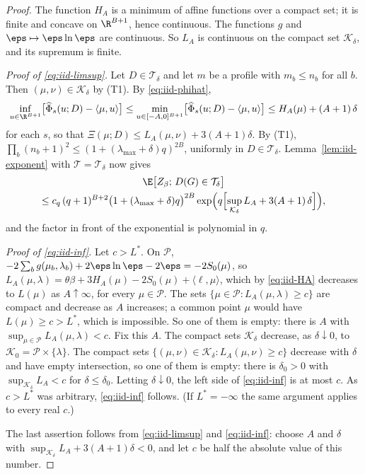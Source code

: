 \begin{proof}
The function $H_A$ is a minimum of affine functions over a compact set; it is finite and
concave on $\R^{B+1}$, hence continuous. The functions $g$ and $\eps\mapsto\eps\ln\eps$ are
continuous. So $L_A$ is continuous on the compact set $\mathcal{K}_\delta$, and its
supremum is finite.

\emph{Proof of \eqref{eq:iid-limsup}.} Let $D\in\mathcal{T}_\delta$ and let $m$ be a
profile with $m_b\le n_b$ for all $b$. Then $(\mu,\nu)\in\mathcal{K}_\delta$ by (T1). By
\eqref{eq:iid-phihat},
\[
\inf_{u\in\R^{B+1}}\bigl[\widehat\Phi_s(u;D)-\langle\mu,u\rangle\bigr]
\le\min_{u\in[-A,0]^{B+1}}\bigl[\widehat\Phi_s(u;D)-\langle\mu,u\rangle\bigr]
\le H_A(\mu)+(A+1)\,\delta
\]
for each $s$, so that $\Xi(\mu;D)\le L_A(\mu,\nu)+3(A+1)\delta$. By (T1),
$\prod_b(n_b+1)^2\le(1+(\lambda_{\max}+\delta)q)^{2B}$, uniformly in
$D\in\mathcal{T}_\delta$. Lemma~\ref{lem:iid-exponent} with
$\mathcal{T}=\mathcal{T}_\delta$ now gives
\begin{multline*}
\E\bigl[Z_\beta;\,D(G)\in\mathcal{T}_\delta\bigr]\\
\le c_q\,(q+1)^{B+2}\bigl(1+(\lambda_{\max}+\delta)q\bigr)^{2B}
\exp\Bigl(q\Bigl[\sup_{\mathcal{K}_\delta}L_A+3(A+1)\,\delta\Bigr]\Bigr),
\end{multline*}
and the factor in front of the exponential is polynomial in $q$.

\emph{Proof of \eqref{eq:iid-inf}.} Let $c>L^\ast$. On $\mathcal{P}$,
$-2\sum_bg(\mu_b,\lambda_b)+2\eps\ln\eps-2\eps=-2S_0(\mu)$, so
$L_A(\mu,\lambda)=\theta\beta+3H_A(\mu)-2S_0(\mu)+\langle\ell,\mu\rangle$, which by
\eqref{eq:iid-HA} decreases to $L(\mu)$ as $A\uparrow\infty$, for every
$\mu\in\mathcal{P}$. The sets $\{\mu\in\mathcal{P}:L_A(\mu,\lambda)\ge c\}$ are compact and
decrease as $A$ increases; a common point $\mu$ would have $L(\mu)\ge c>L^\ast$, which is
impossible. So one of them is empty: there is $A$ with
$\sup_{\mu\in\mathcal{P}}L_A(\mu,\lambda)<c$. Fix this $A$. The compact sets
$\mathcal{K}_\delta$ decrease, as $\delta\downarrow0$, to
$\mathcal{K}_0=\mathcal{P}\times\{\lambda\}$. The compact sets
$\{(\mu,\nu)\in\mathcal{K}_\delta:L_A(\mu,\nu)\ge c\}$ decrease with $\delta$ and have
empty intersection, so one of them is empty: there is $\delta_0>0$ with
$\sup_{\mathcal{K}_\delta}L_A<c$ for $\delta\le\delta_0$. Letting $\delta\downarrow0$, the
left side of \eqref{eq:iid-inf} is at most $c$. As $c>L^\ast$ was arbitrary,
\eqref{eq:iid-inf} follows. (If $L^\ast=-\infty$ the same argument applies to every real
$c$.)

The last assertion follows from \eqref{eq:iid-limsup} and \eqref{eq:iid-inf}: choose $A$
and $\delta$ with $\sup_{\mathcal{K}_\delta}L_A+3(A+1)\delta<0$, and let $c$ be half the
absolute value of this number.
\end{proof}

